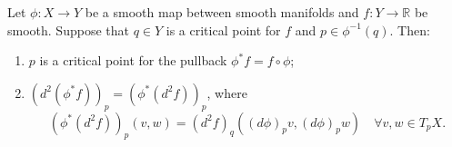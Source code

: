Let $\phi: X \to Y$ be a smooth map between smooth manifolds and $f: Y \to \mathbb{R}$ be smooth. Suppose that $q \in Y$ is a critical point for $f$ and $p \in \phi^{-1}(q)$. Then:
\begin{enumerate}
  \item $p$ is a critical point for the pullback $\phi^* f = f \circ \phi$;
  \item $(d^2 (\phi^* f))_p = (\phi^* (d^2 f))_p$, where
  $$(\phi^* (d^2 f))_p(v, w) = (d^2 f)_q((d\phi)_p v, (d\phi)_p w) \quad \forall v, w \in T_p X.$$
\end{enumerate}
